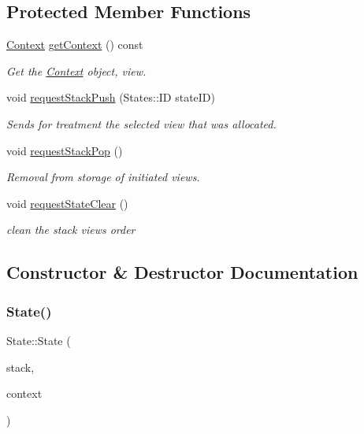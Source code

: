 \subsection*{Protected Member Functions}
\begin{DoxyCompactItemize}
\item 
\hyperlink{structState_1_1Context}{Context} \hyperlink{classState_a93a72915d1aad6d8f7eacc81094dc920}{get\+Context} () const
\begin{DoxyCompactList}\small\item\em Get the \hyperlink{structState_1_1Context}{Context} object, view. \end{DoxyCompactList}\item 
void \hyperlink{classState_a6763de833ceb9c23df45aff163a4a1cd}{request\+Stack\+Push} (States\+::\+ID state\+ID)
\begin{DoxyCompactList}\small\item\em Sends for treatment the selected view that was allocated. \end{DoxyCompactList}\item 
\mbox{\label{classState_aa418660892d6161772c907bd8d70f910}} 
void \hyperlink{classState_aa418660892d6161772c907bd8d70f910}{request\+Stack\+Pop} ()
\begin{DoxyCompactList}\small\item\em Removal from storage of initiated views. \end{DoxyCompactList}\item 
\mbox{\label{classState_a4b602bed9bf0179ee5f6748fce340ae6}} 
void \hyperlink{classState_a4b602bed9bf0179ee5f6748fce340ae6}{request\+State\+Clear} ()
\begin{DoxyCompactList}\small\item\em clean the stack views order \end{DoxyCompactList}\end{DoxyCompactItemize}


\subsection{Constructor \& Destructor Documentation}
\mbox{\label{classState_adc4beeb07281ceb685f87f5ccba73057}} 
\subsubsection{\texorpdfstring{State()}{State()}}
{\footnotesize\ttfamily State\+::\+State (\begin{DoxyParamCaption}\item[{\hyperlink{classStateManager}{State\+Manager} \&}]{stack,  }\item[{\hyperlink{structState_1_1Context}{Context}}]{context }\end{DoxyParamCaption})}



